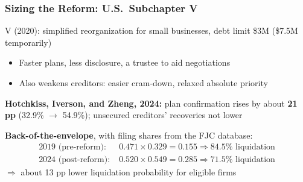 \documentclass[aspectratio=169,xcolor=table]{beamer}
\begin{document}
\begin{frame}[label=sbra_data] \frametitle{Sizing the Reform: U.S.\ Subchapter V \hfill \hyperlink{rec}{}}
V (2020): simplified reorganization for small businesses, debt limit \$3M (\$7.5M temporarily)
\begin{itemize} \small
    \item Faster plans, less disclosure, a trustee to aid negotiations
    \item Also weakens creditors: easier cram-down, relaxed absolute priority
\end{itemize} \vspace{2mm}

\textbf{Hotchkiss, Iverson, and Zheng, 2024:} plan confirmation rises by about \textbf{21 pp} (32.9\% $\to$ 54.9\%); unsecured creditors' recoveries not lower \vspace{2mm}

\textbf{Back-of-the-envelope}, with filing shares from the FJC database:
\[
\begin{aligned}
\text{2019 (pre-reform):}\;& 0.471 \times 0.329 = 0.155 \Rightarrow 84.5\% \text{ liquidation} \\
\text{2024 (post-reform):}\;& 0.520 \times 0.549 = 0.285 \Rightarrow 71.5\% \text{ liquidation}
\end{aligned}
\]
$\Rightarrow$ about 13 pp lower liquidation probability for eligible firms

\end{frame}
\end{document}
